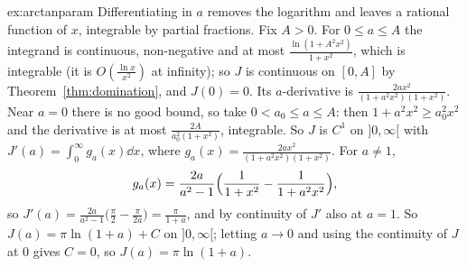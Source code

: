 \begin{solution}{ex:arctanparam}
\idea Differentiating in $a$ removes the logarithm and leaves a rational function of $x$, integrable by partial fractions.
\writeup Fix $A>0$. For $0\le a\le A$ the integrand is continuous, non-negative and at most $\frac{\ln(1+A^2x^2)}{1+x^2}$, which is
integrable (it is $O(\frac{\ln x}{x^2})$ at infinity); so $J$ is continuous on $[0,A]$ by Theorem~\ref{thm:domination}, and $J(0)=0$.
Its $a$-derivative is $\frac{2ax^2}{(1+a^2x^2)(1+x^2)}$. Near $a=0$ there is no good bound, so take $0<a_0\le a\le A$: then
$1+a^2x^2\ge a_0^2x^2$ and the derivative is at most $\frac{2A}{a_0^2(1+x^2)}$, integrable. So $J$ is $C^1$ on $]0,\infty[$ with
$J'(a)=\int_0^\infty g_a(x)\dd x$, where $g_a(x)=\frac{2ax^2}{(1+a^2x^2)(1+x^2)}$. For $a\ne1$,
\[
g_a(x)=\frac{2a}{a^2-1}\Bigl(\frac1{1+x^2}-\frac1{1+a^2x^2}\Bigr),
\]
so $J'(a)=\frac{2a}{a^2-1}\bigl(\frac\pi2-\frac\pi{2a}\bigr)=\frac\pi{1+a}$, and by continuity of $J'$ also at $a=1$. So $J(a)=\pi\ln(1+a)+C$ on
$]0,\infty[$; letting $a\to0$ and using the continuity of $J$ at $0$ gives $C=0$, so $J(a)=\pi\ln(1+a)$.
\end{solution}

